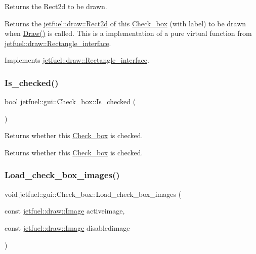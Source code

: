 Returns the Rect2d to be drawn. 

Returns the \hyperlink{classjetfuel_1_1draw_1_1Rect2d}{jetfuel\+::draw\+::\+Rect2d} of this \hyperlink{classjetfuel_1_1gui_1_1Check__box}{Check\+\_\+box} (with label) to be drawn when \hyperlink{classjetfuel_1_1gui_1_1Check__box_ad2ce6d4af8d950a4ef76b0688541c29a}{Draw()} is called. This is a implementation of a pure virtual function from \hyperlink{classjetfuel_1_1draw_1_1Rectangle__interface}{jetfuel\+::draw\+::\+Rectangle\+\_\+interface}. 

Implements \hyperlink{classjetfuel_1_1draw_1_1Rectangle__interface_a03fd3b6842ab7b3065379caec407296f}{jetfuel\+::draw\+::\+Rectangle\+\_\+interface}.

\mbox{\label{classjetfuel_1_1gui_1_1Check__box_a906b159264ffa88cab5d9d467331f229}} 
\subsubsection{\texorpdfstring{Is\+\_\+checked()}{Is\_checked()}}
{\footnotesize\ttfamily bool jetfuel\+::gui\+::\+Check\+\_\+box\+::\+Is\+\_\+checked (\begin{DoxyParamCaption}{ }\end{DoxyParamCaption})\hspace{0.3cm}{\ttfamily [inline]}}



Returns whether this \hyperlink{classjetfuel_1_1gui_1_1Check__box}{Check\+\_\+box} is checked. 

Returns whether this \hyperlink{classjetfuel_1_1gui_1_1Check__box}{Check\+\_\+box} is checked. \mbox{\label{classjetfuel_1_1gui_1_1Check__box_adadc280e5d14f08e64f974ba9156cd16}} 
\subsubsection{\texorpdfstring{Load\+\_\+check\+\_\+box\+\_\+images()}{Load\_check\_box\_images()}}
{\footnotesize\ttfamily void jetfuel\+::gui\+::\+Check\+\_\+box\+::\+Load\+\_\+check\+\_\+box\+\_\+images (\begin{DoxyParamCaption}\item[{const \hyperlink{classjetfuel_1_1draw_1_1Image}{jetfuel\+::draw\+::\+Image}}]{activeimage,  }\item[{const \hyperlink{classjetfuel_1_1draw_1_1Image}{jetfuel\+::draw\+::\+Image}}]{disabledimage }\end{DoxyParamCaption})\hspace{0.3cm}{\ttfamily [inline]}}



